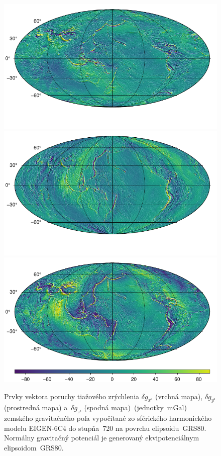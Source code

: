 \documentclass[a4paper,12pt]{book}
\begin{document}
\begin{figure}
\centering
\includegraphics{./fig-gravity-disturbance-on-grs80-x.pdf}
\includegraphics{./fig-gravity-disturbance-on-grs80-y.pdf}
\includegraphics{./fig-gravity-disturbance-on-grs80-z.pdf}
\caption{Prvky vektora poruchy tiažového zrýchlenia $\delta g_{x^\mathrm{s}}$ 
(vrchná mapa), $\delta g_{y^\mathrm{s}}$ (prostredná mapa) a~$\delta 
g_{z^\mathrm{s}}$ (spodná mapa)~(jednotky~$\mathrm{mGal}$) zemského 
gravitačného poľa vypočítané zo sférického harmonického modelu EIGEN-6C4 do 
stupňa~720 na povrchu elipsoidu~GRS80.  Normálny gravitačný potenciál je 
generovaný ekvipotenciálnym elipsoidom~GRS80.}
\label{fig:dg_ggm_grs80}
\end{figure}
\end{document}
